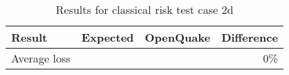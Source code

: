 \begin{table}[htbp]

\centering
\begin{tabular}{ l r r r }

\hline
\rowcolor{anti-flashwhite}
\bf{Result} & \bf{Expected} & \bf{OpenQuake} & \bf{Difference}\\
\hline
Average loss &  &  & 0\% \\
\hline
\end{tabular}

\caption{Results for classical risk test case 2d}
\label{tab:result-classical-risk-2d}
\end{table}